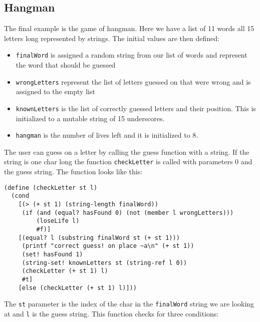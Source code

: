 \subsection{Hangman}
The final example is the game of hangman.
Here we have a list of 11 words all 15 letters long represented by strings. The initial values are then defined:
\begin{itemize}
\item \lstinline!finalWord! is assigned a random string from our list of words and represent the word that should be guessed
\item \lstinline!wrongLetters! represent the list of letters guessed on that were wrong and is assigned to the empty list
\item \lstinline!knownLetters! is the list of correctly guessed letters and their position. This is initialized to a mutable string of 15 underscores.
\item \lstinline!hangman! is the number of lives left and it is initialized to 8.
\end{itemize}

The user can guess on a letter by calling the guess function with a string.
If the string is one char long the function \lstinline!checkLetter! is called with parameters 0 and the guess string. The function looks like this:

\begin{lstlisting}
(define (checkLetter st l)
  (cond
    [(> (+ st 1) (string-length finalWord))
     (if (and (equal? hasFound 0) (not (member l wrongLetters)))
         (loseLife l)
         #f)]
    [(equal? l (substring finalWord st (+ st 1)))
     (printf "correct guess! on place ~a\n" (+ st 1))
     (set! hasFound 1)
     (string-set! knownLetters st (string-ref l 0))
     (checkLetter (+ st 1) l)
     #t]
    [else (checkLetter (+ st 1) l)]))
\end{lstlisting}

The \lstinline!st! parameter is the index of the char in the \lstinline!finalWord! string we are looking at and \lstinline!l! is the guess string.
This function checks for three conditions:

